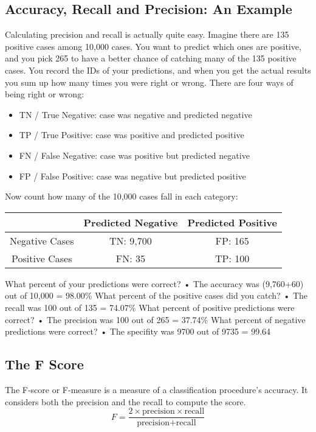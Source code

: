 \documentclass[12pt]{article}
\begin{document}
\subsection*{Accuracy, Recall and Precision: An Example}
Calculating precision and recall is actually quite easy. Imagine there are
135 positive cases among 10,000 cases. You want to predict which ones are
positive, and you pick 265 to have a better chance of catching many of the
135 positive cases. You record the IDs of your predictions, and when you
get the actual results you sum up how many times you were right or wrong.
There are four ways of being right or wrong:
\begin{itemize}
\item TN / True Negative: case was negative and predicted negative
\item TP / True Positive: case was positive and predicted positive
\item  FN / False Negative: case was positive but predicted negative
\item FP / False Positive: case was negative but predicted positive
\end{itemize}
Now count how many of the 10,000 cases fall in each category:
\begin{center}
\begin{tabular}{|c|c|c|}
  & Predicted Negative & Predicted Positive \\ \hline
Negative Cases & TN: 9,700 & FP: 165 \\ \hline
Positive Cases &  FN: 35 & TP: 100 \\ \hline
\end{tabular}
\end{center}
What percent of your predictions were correct?
• The accuracy was (9,760+60) out of 10,000 = 98.00\%
What percent of the positive cases did you catch?
• The recall was 100 out of 135 = 74.07\%
What percent of positive predictions were correct?
• The precision was 100 out of 265 = 37.74\%
What percent of negative predictions were correct?
• The specifity was 9700 out of 9735 = 99.64%
\subsection*{The F Score}
The F-score or F-measure is a measure of a classification procedure’s accuracy.
It considers both the precision and the recall to compute the score.
\[ F = \frac{2 \times \mbox{precision} \times \mbox{recall}}{\mbox{precision} + \mbox{recall}}\]

\newpage
\end{document}
